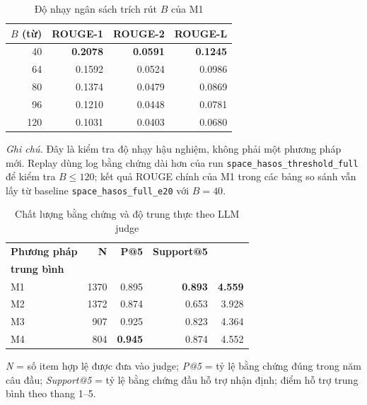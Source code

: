 \documentclass[12pt,a4paper]{report}
\begin{document}
\begin{table}[tbp]
\centering
\caption{Độ nhạy ngân sách trích rút $B$ của M1}
\label{tab:m1-token-sweep}
\small
\begin{tabular}{r r r r}
\toprule
\textbf{$B$ (từ)} & \textbf{ROUGE-1} & \textbf{ROUGE-2} & \textbf{ROUGE-L} \\
\midrule
40  & \textbf{\num{0.2078}} & \textbf{\num{0.0591}} & \textbf{\num{0.1245}} \\
64  & \num{0.1592} & \num{0.0524} & \num{0.0986} \\
80  & \num{0.1374} & \num{0.0479} & \num{0.0869} \\
96  & \num{0.1210} & \num{0.0448} & \num{0.0781} \\
120 & \num{0.1031} & \num{0.0403} & \num{0.0680} \\
\bottomrule
\end{tabular}

\vspace{0.35em}
\begin{minipage}{0.82\textwidth}
\footnotesize\RaggedRight
\textit{Ghi chú.} Đây là kiểm tra độ nhạy hậu nghiệm, không phải một phương pháp mới. Replay dùng log bằng chứng dài hơn của run \texttt{space\_hasos\_threshold\_full} để kiểm tra $B \leq 120$; kết quả ROUGE chính của M1 trong các bảng so sánh vẫn lấy từ baseline \texttt{space\_hasos\_full\_e20} với $B=40$.
\end{minipage}
\end{table}



\begin{table}[tbp]
\centering
\caption{Chất lượng bằng chứng và độ trung thực theo LLM judge}
\label{tab:evidence-faithfulness}
\begin{threeparttable}
\begin{tabular}{l r r r r}
\toprule
\textbf{Phương pháp} & \textbf{N} & \textbf{P@5} & \textbf{Support@5} & \makecell{\textbf{Điểm hỗ trợ}\\\textbf{trung bình}} \\
\midrule
M1 & 1370 & \num{0.895} & \textbf{\num{0.893}} & \textbf{\num{4.559}} \\
M2 & 1372 & \num{0.874} & \num{0.653} & \num{3.928} \\
M3 &  907 & \num{0.925} & \num{0.823} & \num{4.364} \\
M4 &  804 & \textbf{\num{0.945}} & \num{0.874} & \num{4.552} \\
\bottomrule
\end{tabular}
\begin{tablenotes}
\footnotesize
\item \textit{N} = số item hợp lệ được đưa vào judge; \textit{P@5} = tỷ lệ bằng chứng đúng trong năm câu đầu; \textit{Support@5} = tỷ lệ bằng chứng đầu hỗ trợ nhận định; điểm hỗ trợ trung bình theo thang 1--5.
\end{tablenotes}
\end{threeparttable}
\end{table}
\end{document}
